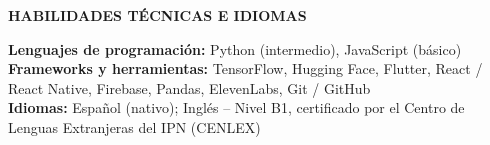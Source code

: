 \documentclass[11pt]{article}
\newcommand{\seccion}[1]{%
    \vspace{4pt}
    \begin{center}
        \textbf{\MakeUppercase{#1}}
    \end{center}
    \vspace{-10pt}
    \hrulefill
    \vspace{2pt}
}
\begin{document}
\seccion{Habilidades Técnicas e Idiomas}

\textbf{Lenguajes de programación:} Python (intermedio), JavaScript (básico)\\
\vspace{6pt}
\textbf{Frameworks y herramientas:} TensorFlow, Hugging Face, Flutter, React / React Native, Firebase, Pandas, ElevenLabs, Git / GitHub\\
\vspace{6pt}
\textbf{Idiomas:} Español (nativo); Inglés -- Nivel B1, certificado por el Centro de Lenguas Extranjeras del IPN (CENLEX)
\end{document}
